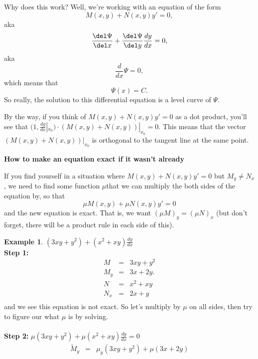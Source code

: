 \documentclass[a5paper]{article}
\theoremstyle{definition}%
\newtheorem*{example*}{Example}
\numberwithin{exercise}{section}
\theoremstyle{remark}%
\begin{document}
\noindent Why does this work? Well, we're working with an equation of the form 
\[ M(x,y)+ N(x,y)y'=0,\]
aka
$$\frac{\del\Psi}{\del x}+ \frac{\del\Psi}{\del y}\frac{dy}{dx	} = 0,$$
aka
$$\frac{d}{dx}\Psi = 0,$$
which means that
$$\Psi(x)=C.$$
So really, the solution to this differential equation is a level curve of $\Psi$. 


\noindent By the way, if you think of $M(x,y)+ N(x,y)y'=0$ as a dot product, you'll see that $(1, \frac{dy}{dx}|_{x_0})\cdot(M(x,y)+ N(x,y))|_{x_0}=0$. This means that the vector $(M(x,y)+ N(x,y))|_{x_0}$ is orthogonal to the tangent line at the same point. 


\begin{highlight}
\textbf{How to make an equation exact if it wasn't already}

If you find yourself in a situation where $M(x,y)+ N(x,y)y'=0$ but $M_y\neq N_x$, we need to find some function $\mu$\footnotemark that we can multiply the both sides of the equation by, so that
$$\mu M(x,y)+ \mu N(x,y)y'=0$$
and the new equation is exact. That is, we want $(\mu M)_y=(\mu N)_x$ (but don't forget, there will be a product rule in each side of this). 

\begin{example*}
$(3xy+y^2)+(x^2+xy)\frac{dy}{dx}$\\
\textbf{Step 1:}
\[\begin{array}{rcl}
M &=& 3xy+y^2\\
M_y &=& 3x+2y.\\

N &=& x^2+xy\\
N_x &=& 2x+y\\
\end{array}\]
and we see this equation is not exact. So let's multiply by $\mu$ on all sides, then try to figure our what $\mu$ is by solving. \\
\mbox{}\\
\textbf{Step 2:}
$\mu(3xy+y^2)+\mu(x^2+xy)\frac{dy}{dx}=0$\\
\[\begin{array}{rcl}
\widetilde{M}_y &=& \mu_y(3xy+y^2)+\mu(3x+2y)\\


\end{array}\]
\end{example*}
\end{highlight}
\end{document}
